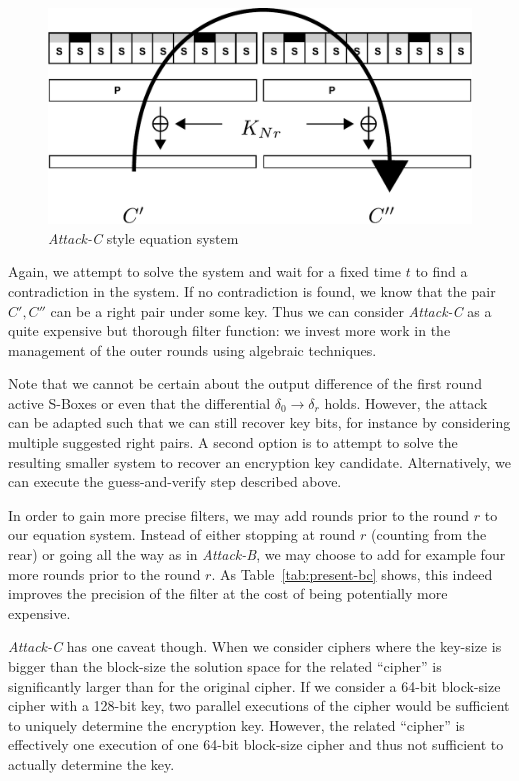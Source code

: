 \begin{figure}[h]
 \centering
 \includegraphics[width=.6\textwidth]{./attack-c.pdf}
 \caption{\emph{Attack-C} style equation system}
 \label{fig:attack-c}
\end{figure}


Again, we attempt to solve the system and wait for a fixed time $t$ to find a contradiction in the system. If no contradiction is found, we know that the pair $C',C''$ can be a right pair under some key. Thus we can consider \emph{Attack-C} as a quite expensive but thorough filter function: we invest more work in the management of the outer rounds using algebraic techniques.

Note that we cannot be certain about the output difference of the first round active S-Boxes or even that the differential $\delta_0 \rightarrow \delta_r$ holds. However, the attack can be adapted such that we can still recover key bits, for instance by considering multiple suggested right pairs. A second option is to attempt to solve the resulting smaller system to recover an encryption key candidate. Alternatively, we can execute the guess-and-verify step described above.

In order to gain more precise filters, we may add rounds prior to the round $r$ to our equation system. Instead of either stopping at round $r$ (counting from the rear) or going all the way as in \emph{Attack-B}, we may choose to add for example four more rounds prior to the round $r$. As Table~\ref{tab:present-bc} shows, this indeed improves the precision of the filter at the cost of being potentially more expensive.

\emph{Attack-C} has one caveat though. When we consider ciphers where the key-size is bigger than the block-size the solution space for the related ``cipher'' is significantly larger than for the original cipher. If we consider a 64-bit block-size cipher with a 128-bit key, two parallel executions of the cipher would be sufficient to uniquely determine the encryption key. However, the related ``cipher'' is effectively one execution of one 64-bit block-size cipher and thus not sufficient to actually determine the key.


